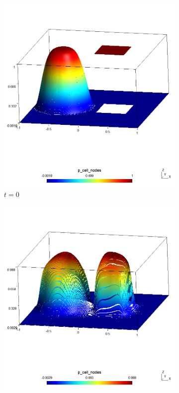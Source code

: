 \begin{figure}[h!]
    \centering
    \begin{subfigure}{.5\textwidth}
        \centering
        \includegraphics[width=\linewidth]{../figs/sols/kriv-sol0-3d-h14400o01}
        \caption{$t = 0$}
    \end{subfigure}%
    \begin{subfigure}{.5\textwidth}
        \centering
        \includegraphics[width=\linewidth]{../figs/sols/kriv-sol-3d-h14400o01}

\end{subfigure}
\end{figure}
